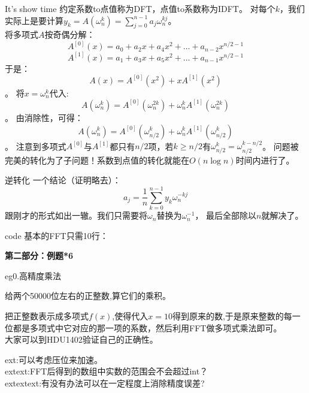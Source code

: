 \documentclass[allowframebreaks,10pt]{beamer}
\begin{document}
\begin{frame}{It's show time}
约定系数to点值称为DFT，点值to系数称为IDFT。
\pause
对每个$k$，我们实际上是要计算$y_k = A(\omega_n^k) = \sum_{j=0}^{n-1}a_j \omega_n^{kj}$。
\pause
\\ 将多项式$A$按奇偶分解：
\pause
\[ A^{[0]}(x) = a_0 + a_2x + a_4x^2 + \ldots + 
a_{n-2}x^{n/2-1}\]
\pause
\[ A^{[1]}(x) = a_1 + a_3x + a_5x^2 + \ldots + 
a_{n-1}x^{n/2-1}\]
\pause
于是：
\[ A(x) = A^{[0]}(x^2) + x A^{[1]}(x^2)\]。
\pause
将$x=\omega_n^k$代入:
\[ A(\omega_n^k) = A^{[0]}(\omega_n^{2k}) + \omega_n^k A^{[1]}(\omega_n^{2k})\]。
\pause
由消除性，可得：
\[ A(\omega_n^k) = A^{[0]}(\omega_{n/2}^{k}) + \omega_n^k A^{[1]}(\omega_{n/2}^{k})\]。
\pause
注意到多项式$A^{[0]}$与$A^{[1]}$都只有$n/2$项，若$k \ge n/2$有$\omega_{n/2}^k = \omega_{n/2}^{k-n/2}$。
\pause
问题被完美的转化为了子问题！系数到点值的转化就能在$O(n \log n)$时间内进行了。
\end{frame}
\begin{frame}{逆转化}
\pause
一个结论（证明略去）：
\[ a_j = \frac{1}{n} \sum_{k=0}^{n-1} y_k \omega_n^{-kj}\]
\pause
跟刚才的形式如出一辙。我们只需要将$\omega_n$替换为$\omega_n^{-1}$，
最后全部除以$n$就解决了。
\end{frame}

\begin{frame}{code}
基本的FFT只需10行：\\[1ex]
{\footnotesize

}
\end{frame}

\begin{frame}[plain]
\begin{center}
\textbf{第二部分：例题*6}
\end{center}
\end{frame}

\begin{frame}{eg0.高精度乘法}
\begin{example}
给两个50000位左右的正整数,算它们的乘积。
\end{example}
\pause
\begin{solution}
把正整数表示成多项式$f(x)$,使得代入$x=10$得到原来的数,于是原来整数的每一位都是多项式中它对应的那一项的系数，然后利用FFT做多项式乘法即可。
\\ 大家可以到HDU1402验证自己的正确性。
\end{solution}
\pause
ext:可以考虑压位来加速。\\
\pause
extext:FFT后得到的数组中实数的范围会不会超过int？ \\
\pause
extextext:有没有办法可以在一定程度上消除精度误差? 
\end{frame}
\end{document}
